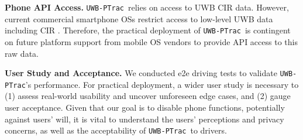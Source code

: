\documentclass[sigconf]{acmart}
\newcommand{\edited}[1]{#1}
\newcommand{\name}{{{\tt UWB-PTrac}}}
\begin{document}
\noindent
\edited{\textbf{Phone API Access.}
\name\ relies on access to UWB CIR data. However, current commercial 
smartphone OSs restrict access to low-level UWB data including 
CIR \cite{zhang2023embracing}. Therefore, the practical
deployment of \name\ is contingent on future platform support 
from mobile OS vendors to provide API access to this raw data. }

\noindent
\edited{\textbf{User Study and Acceptance.}
We conducted e2e driving tests to validate \name's
performance. For practical deployment, a wider user study is necessary 
 to (1) assess real-world usability and uncover unforeseen edge cases, 
 and (2) gauge user acceptance. Given that our goal is to disable phone 
 functions, potentially against users' will, it is vital to 
 understand the users' perceptions and privacy concerns, as well
 as the acceptability of \name\ to drivers.}







\end{document}
